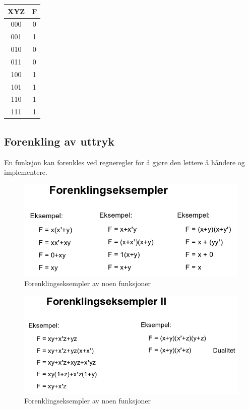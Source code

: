 \documentclass{article}
\begin{document}
		\begin{center}
			\begin{tabular}{|c|c|}
				\hline
				XYZ & F \\ \hline
				000 & 0  \\ \hline
				001 & 1  \\ \hline 
				010 & 0  \\ \hline
				011 & 0  \\ \hline 
				100 & 1  \\ \hline
				101 & 1  \\ \hline
				110 & 1  \\ \hline
				111 & 1  \\ \hline
				
			\end{tabular}
		\end{center}
	
	
	\subsection{Forenkling av uttryk}
	En funksjon kan forenkles ved regneregler for å gjøre den lettere å håndere og implementere.
	
	\begin{figure}[H]
		\includegraphics[scale=0.6]{Forenkling.png}
		\caption{Forenklingseksempler av noen funksjoner}
	\end{figure}
	
	\begin{figure}[H]
		\includegraphics[scale=0.6]{Forenkling2.png}
		\caption{Forenklingseksempler av noen funksjoner}
	\end{figure}
	
\end{document}
